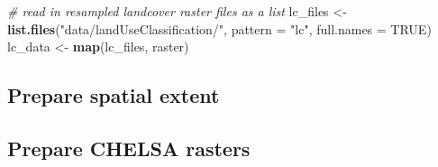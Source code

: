 \documentclass[]{article}
\newenvironment{Shaded}{\begin{snugshade}}{\end{snugshade}}
\newcommand{\CommentTok}[1]{\textcolor[rgb]{0.56,0.35,0.01}{\textit{#1}}}
\newcommand{\DataTypeTok}[1]{\textcolor[rgb]{0.13,0.29,0.53}{#1}}
\newcommand{\DecValTok}[1]{\textcolor[rgb]{0.00,0.00,0.81}{#1}}
\newcommand{\FloatTok}[1]{\textcolor[rgb]{0.00,0.00,0.81}{#1}}
\newcommand{\KeywordTok}[1]{\textcolor[rgb]{0.13,0.29,0.53}{\textbf{#1}}}
\newcommand{\NormalTok}[1]{#1}
\newcommand{\OperatorTok}[1]{\textcolor[rgb]{0.81,0.36,0.00}{\textbf{#1}}}
\newcommand{\OtherTok}[1]{\textcolor[rgb]{0.56,0.35,0.01}{#1}}
\newcommand{\StringTok}[1]{\textcolor[rgb]{0.31,0.60,0.02}{#1}}
\begin{document}
\begin{Shaded}
\begin{Highlighting}[numbers=left,,]
\CommentTok{# read in resampled landcover raster files as a list}
\NormalTok{lc_files <-}\StringTok{ }\KeywordTok{list.files}\NormalTok{(}\StringTok{"data/landUseClassification/"}\NormalTok{, }\DataTypeTok{pattern =} \StringTok{"lc"}\NormalTok{, }\DataTypeTok{full.names =} \OtherTok{TRUE}\NormalTok{)}
\NormalTok{lc_data <-}\StringTok{ }\KeywordTok{map}\NormalTok{(lc_files, raster)}
\end{Highlighting}
\end{Shaded}

\hypertarget{prepare-spatial-extent}{%
\subsection{Prepare spatial extent}\label{prepare-spatial-extent}}

\begin{Shaded}
\end{Shaded}

\hypertarget{prepare-chelsa-rasters}{%
\subsection{Prepare CHELSA rasters}\label{prepare-chelsa-rasters}}
\end{document}
